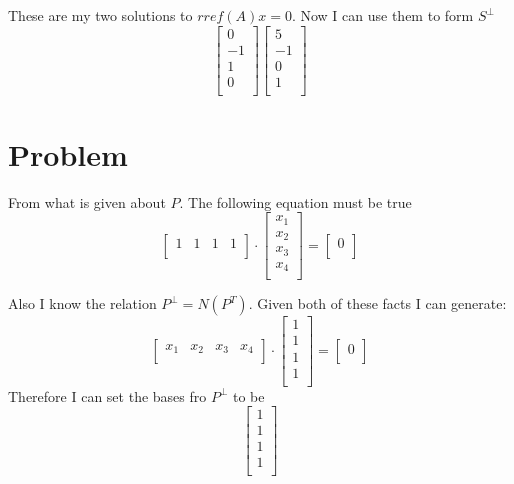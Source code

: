 \documentclass{article}
\begin{document}
These are my two solutions to $rref(A)x = 0$. Now I can use them to form $S^{\perp}$
\[
\begin{bmatrix}
0 \\
-1 \\
1 \\
0 \\
\end{bmatrix}
\begin{bmatrix}
5 \\
-1 \\
0 \\
1 \\
\end{bmatrix}
\]
\section{Problem}
From what is given about $P$. The following equation must be true
\[
\begin{bmatrix}
1 & 1 & 1 & 1 \\
\end{bmatrix}
\cdot
\begin{bmatrix}
x_1 \\
x_2 \\
x_3 \\
x_4 \\
\end{bmatrix}
=
\begin{bmatrix}
0 \\
\end{bmatrix}
\]

Also I know the relation $P^{\perp} = N(P^{T})$. Given both of these facts I can generate:
\[
\begin{bmatrix}
x_1 & x_2 & x_3 & x_4 \\
\end{bmatrix}
\cdot
\begin{bmatrix}
1 \\
1 \\
1 \\
1 \\
\end{bmatrix}
=
\begin{bmatrix}
0 \\
\end{bmatrix}
\]
Therefore I can set the bases fro $P^{\perp}$ to be 
\[
\begin{bmatrix}
1 \\
1 \\
1 \\
1 \\
\end{bmatrix}
\]
\end{document}
